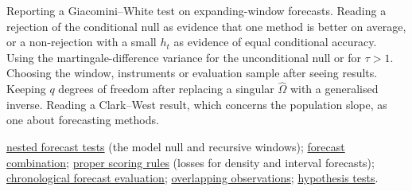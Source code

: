 \begin{qfmethod}
 Reporting a Giacomini--White test on expanding-window forecasts. Reading a rejection of the conditional null as evidence that one method is better on average, or a non-rejection with a small $h_t$ as evidence of equal conditional accuracy. Using the martingale-difference variance for the unconditional null or for $\tau>1$. Choosing the window, instruments or evaluation sample after seeing results. Keeping $q$ degrees of freedom after replacing a singular $\hat\Omega$ with a generalised inverse. Reading a Clark--West result, which concerns the population slope, as one about forecasting methods.

 \hyperref[meth:nested-forecast-tests]{nested forecast tests} (the model null and recursive windows); \hyperref[meth:forecast-combination]{forecast combination}; \hyperref[meth:proper-scoring-rules]{proper scoring rules} (losses for density and interval forecasts); \hyperref[meth:forecast-accuracy-evaluation]{chronological forecast evaluation}; \hyperref[meth:correlation-independence-tests]{overlapping observations}; \hyperref[meth:hypothesis-testing]{hypothesis tests}.

\end{qfmethod}
